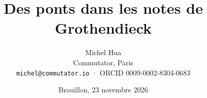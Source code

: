 \documentclass[11pt]{article}
\title{Des ponts dans les notes de Grothendieck}
\author{Michel Hua\\ \small Commutator, Paris\\ \small\texttt{michel@commutator.io} · ORCID 0009-0002-8304-0683}
\date{Brouillon, 23 novembre 2026}
\begin{document}
\maketitle

\tableofcontents









\appendix

\begin{english}\renewcommand{\refname}{Références}

\end{english}
\end{document}
